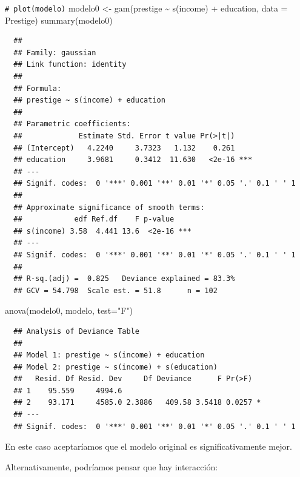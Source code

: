 \documentclass[
]{book}
\newenvironment{Shaded}{\begin{snugshade}}{\end{snugshade}}
\newcommand{\AttributeTok}[1]{\textcolor[rgb]{0.77,0.63,0.00}{#1}}
\newcommand{\CommentTok}[1]{\textcolor[rgb]{0.56,0.35,0.01}{\textit{#1}}}
\newcommand{\FunctionTok}[1]{\textcolor[rgb]{0.00,0.00,0.00}{#1}}
\newcommand{\NormalTok}[1]{#1}
\newcommand{\OtherTok}[1]{\textcolor[rgb]{0.56,0.35,0.01}{#1}}
\newcommand{\SpecialCharTok}[1]{\textcolor[rgb]{0.00,0.00,0.00}{#1}}
\newcommand{\StringTok}[1]{\textcolor[rgb]{0.31,0.60,0.02}{#1}}
\theoremstyle{break}
\theoremstyle{nonumberplain}
\renewcommand{\CommentTok}[1]{\textcolor[rgb]{0.41,0.41,0.41}{\texttt{#1}}}
\begin{document}
\begin{Shaded}
\begin{Highlighting}[]
\CommentTok{\# plot(modelo)}
\NormalTok{modelo0 }\OtherTok{\textless{}{-}} \FunctionTok{gam}\NormalTok{(prestige }\SpecialCharTok{\textasciitilde{}} \FunctionTok{s}\NormalTok{(income) }\SpecialCharTok{+}\NormalTok{ education, }\AttributeTok{data =}\NormalTok{ Prestige)}
\FunctionTok{summary}\NormalTok{(modelo0)}
\end{Highlighting}
\end{Shaded}

\begin{verbatim}
  ## 
  ## Family: gaussian 
  ## Link function: identity 
  ## 
  ## Formula:
  ## prestige ~ s(income) + education
  ## 
  ## Parametric coefficients:
  ##             Estimate Std. Error t value Pr(>|t|)    
  ## (Intercept)   4.2240     3.7323   1.132    0.261    
  ## education     3.9681     0.3412  11.630   <2e-16 ***
  ## ---
  ## Signif. codes:  0 '***' 0.001 '**' 0.01 '*' 0.05 '.' 0.1 ' ' 1
  ## 
  ## Approximate significance of smooth terms:
  ##            edf Ref.df    F p-value    
  ## s(income) 3.58  4.441 13.6  <2e-16 ***
  ## ---
  ## Signif. codes:  0 '***' 0.001 '**' 0.01 '*' 0.05 '.' 0.1 ' ' 1
  ## 
  ## R-sq.(adj) =  0.825   Deviance explained = 83.3%
  ## GCV = 54.798  Scale est. = 51.8      n = 102
\end{verbatim}

\begin{Shaded}
\begin{Highlighting}[]
\FunctionTok{anova}\NormalTok{(modelo0, modelo, }\AttributeTok{test=}\StringTok{"F"}\NormalTok{)}
\end{Highlighting}
\end{Shaded}

\begin{verbatim}
  ## Analysis of Deviance Table
  ## 
  ## Model 1: prestige ~ s(income) + education
  ## Model 2: prestige ~ s(income) + s(education)
  ##   Resid. Df Resid. Dev     Df Deviance      F Pr(>F)  
  ## 1    95.559     4994.6                                
  ## 2    93.171     4585.0 2.3886   409.58 3.5418 0.0257 *
  ## ---
  ## Signif. codes:  0 '***' 0.001 '**' 0.01 '*' 0.05 '.' 0.1 ' ' 1
\end{verbatim}

En este caso aceptaríamos que el modelo original es significativamente mejor.

Alternativamente, podríamos pensar que hay interacción:
\end{document}
